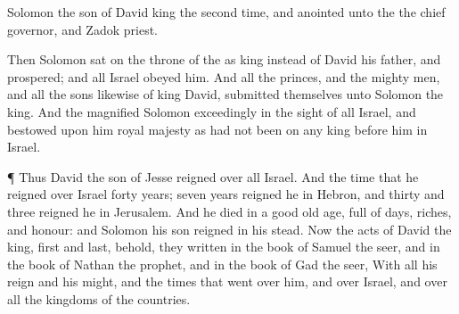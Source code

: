 {Solomon the
son of
David
king the second
time, and
anointed
{} unto the
{}
{} the chief
governor, and
Zadok
{}
priest.
\par }{\PP {}Then
Solomon sat
on the
throne of the
{} as
king instead of
David his
father, and
prospered; and all
Israel
obeyed him.
And all the
princes, and the mighty
men, and all the
sons likewise of
king
David, submitted
themselves unto
Solomon the
king.
And the
{}
magnified
Solomon
exceedingly in the
sight of all
Israel, and
bestowed upon him
{}
royal
majesty as had not been on any
king
before him in
Israel.
\par }{\PP {}¶ Thus
David the
son of
Jesse
reigned over all
Israel.
And the
time that he
reigned over
Israel
{}
forty
years;
seven
years
reigned he in
Hebron, and
thirty and
three
{}
reigned he in
Jerusalem.
And he
died in a
good old
age,
full of
days,
riches, and
honour: and
Solomon his
son
reigned in his stead.
Now the
acts of
David the
king,
first and
last, behold, they
{}
written in the
book of
Samuel the
seer, and in the
book of
Nathan the
prophet, and in the
book of
Gad the
seer,
With all his
reign and his
might, and the
times that went
over him, and over
Israel, and over all the
kingdoms of the
countries.
\par }